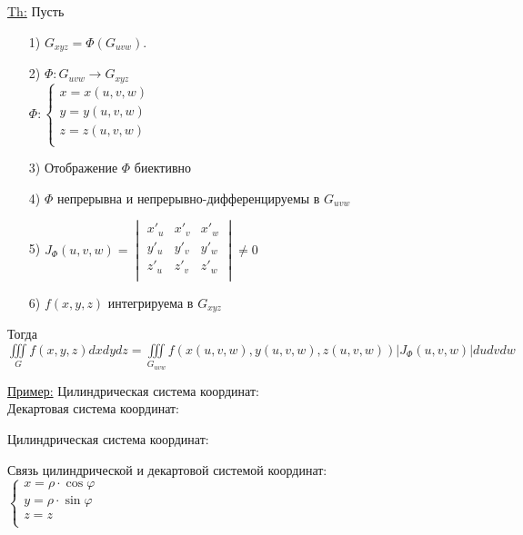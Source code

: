 
\underline{Th:} Пусть 
\begin{enumerate}
	\item[1)]
	$G_{xyz} = \Phi (G_{uvw}).$
	
	\item[2)]
	$\Phi: G_{uvw} \to G_{xyz}$ \\
	$\Phi: 
	\begin{cases}
		x = x(u,v,w) \\
		y = y(u,v,w) \\
		z = z(u,v,w) \\
	\end{cases}$
	
	\item[3)] 
	Отображение $\Phi$ биективно
	
	\item[4)]
	$\Phi$ непрерывна и непрерывно-дифференцируемы в $G_{uvw}$
	
	\item[5)]
	$J_\Phi (u,v,w) = 
	\begin{vmatrix}
		x'_u & x'_v & x'_w \\
		y'_u & y'_v & y'_w \\
		z'_u & z'_v & z'_w \\
	\end{vmatrix} \neq 0$
	
	\item[6)] 
	$f(x,y,z)$ интегрируема в $G_{xyz}$ 
\end{enumerate}

Тогда \\
$\iiint\limits_{G} f(x,y,z) dxdydz = 
\iiint\limits_{G_{uvw}} f\left( x\left(u,v,w\right), y\left(u,v,w\right), z\left(u,v,w\right) \right)  \left| J_\Phi (u,v,w) \right| du dv dw$

\underline{Пример:} Цилиндрическая система координат: \\

Декартовая система координат:

Цилиндрическая система координат:

Связь цилиндрической и декартовой системой координат: \\

$\begin{cases}
	x = \rho \cdot \cos{\varphi} \\
	y = \rho \cdot \sin{\varphi} \\
	z = z \\
\end{cases}$\\

